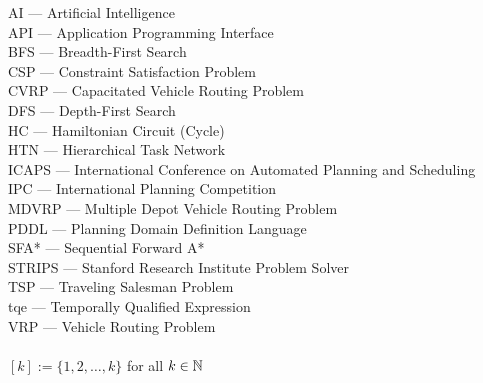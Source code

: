 AI --- Artificial Intelligence\\
API --- Application Programming Interface\\
BFS --- Breadth-First Search\\
CSP --- Constraint Satisfaction Problem\\
CVRP --- Capacitated Vehicle Routing Problem\\
DFS --- Depth-First Search\\
HC --- Hamiltonian Circuit (Cycle)\\
HTN --- Hierarchical Task Network\\
ICAPS --- International Conference on Automated Planning and Scheduling\\
IPC --- International Planning Competition\\
MDVRP --- Multiple Depot Vehicle Routing Problem\\
PDDL --- Planning Domain Definition Language\\
SFA* --- Sequential Forward A*\\
STRIPS --- Stanford Research Institute Problem Solver\\
TSP --- Traveling Salesman Problem\\
tqe --- Temporally Qualified Expression\\
VRP --- Vehicle Routing Problem\\
\\
$[k] := \{1, 2, \ldots, k\}$ for all $k \in \mathbb{N}$\\
